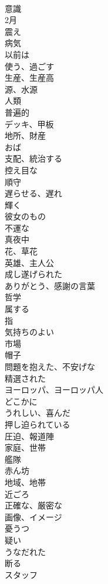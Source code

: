 \documentclass[8pt]{extreport}
\begin{document}
\begin{CJK}{UTF8}{min}
\\	意識
\\	2月
\\	震え
\\	病気
\\	以前は
\\	使う、過ごす
\\	生産、生産高
\\	源、水源
\\	人類
\\	普遍的
\\	デッキ、甲板
\\	地所、財産
\\	おば
\\	支配、統治する
\\	控え目な
\\	順守
\\	遅らせる、遅れ
\\	輝く
\\	彼女のもの
\\	不運な
\\	真夜中
\\	花、草花
\\	英雄、主人公
\\	成し遂げられた
\\	ありがとう、感謝の言葉
\\	哲学
\\	属する
\\	指
\\	気持ちのよい
\\	市場
\\	帽子
\\	問題を抱えた、不安げな
\\	精選された
\\	ヨーロッパ、ヨーロッパ人
\\	どこかに
\\	うれしい、喜んだ
\\	押し迫られている
\\	圧迫、報道陣
\\	家庭、世帯
\\	艦隊
\\	赤ん坊
\\	地域、地帯
\\	近ごろ
\\	正確な、厳密な
\\	画像、イメージ
\\	憂うつ
\\	疑い
\\	うなだれた
\\	断る
\\	スタッフ

\end{CJK}
\end{document}
